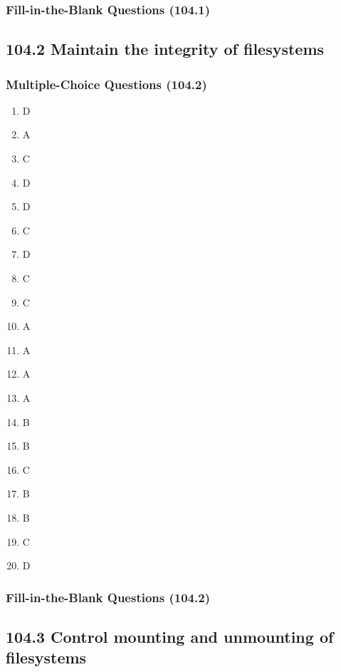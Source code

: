 \documentclass[a4paper]{report}
\begin{document}
\subsubsection*{Fill-in-the-Blank Questions (104.1)}

\subsection*{104.2 Maintain the integrity of filesystems}
\subsubsection*{Multiple-Choice Questions (104.2)}
\begin{enumerate}[1.]
    \item D
    \item A
    \item C
    \item D
    \item D
    \item C
    \item D
    \item C
    \item C
    \item A
    \item A
    \item A
    \item A
    \item B
    \item B
    \item C
    \item B
    \item B
    \item C
    \item D
\end{enumerate}

\subsubsection*{Fill-in-the-Blank Questions (104.2)}

\subsection*{104.3 Control mounting and unmounting of filesystems}
\end{document}
